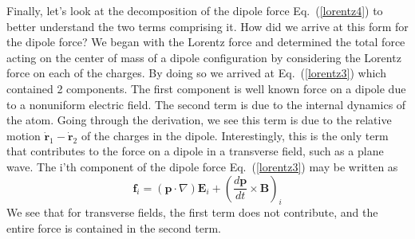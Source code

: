 Finally, let's look at the decomposition of the dipole force Eq.\ (\ref{lorentz4}) to better understand the two terms comprising it.  How did we arrive at this form for the dipole force?  We began with the Lorentz force and determined the total force acting on the center of mass of a dipole configuration by considering the Lorentz force on each of the charges. By doing so we arrived at Eq.\ (\ref{lorentz3}) which contained 2 components.  The first component is well known force on a dipole due to a nonuniform electric field.  The second term is due to the internal dynamics of the atom.  Going through the derivation, we see this term is due to the relative motion $\dot{\mathbf{r}}_1-\dot{\mathbf{r}}_2$ of the charges in the dipole. Interestingly, this is the only term that contributes to the force on a dipole in a transverse field, such as a plane wave. The i'th component of the dipole force Eq.\ (\ref{lorentz3}) may be written as
\begin{equation}
\mathbf{f}_i =\left(\mathbf{p}\cdot\nabla\right)\mathbf{E}_i+\left(\frac{d\mathbf{p}}{dt}\times\mathbf{B}\right)_i
\label{lorentz6}
\end{equation}
We see that for transverse fields, the first term does not contribute, and the entire force is contained in the second term. 


\newpage
